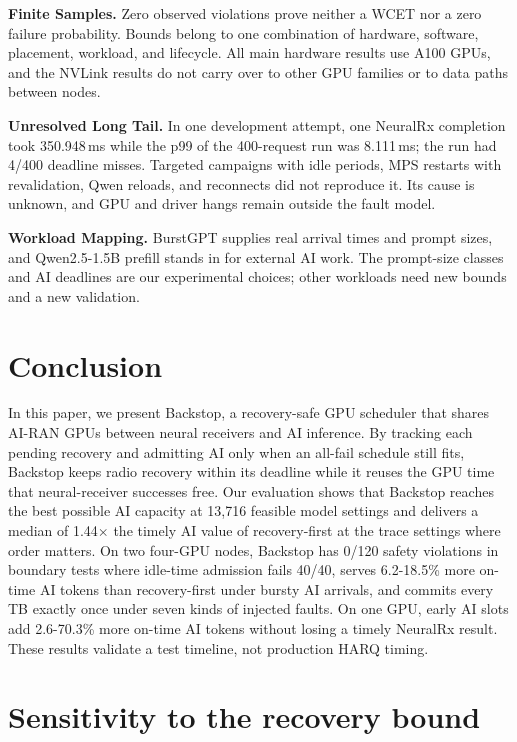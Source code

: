 \documentclass[acmsmall,screen,review,anonymous]{acmart}
\newcommand{\sys}{Backstop\xspace}
\newcommand{\NRx}{NeuralRx\xspace}
\begin{document}
\noindent\textbf{Finite Samples.}
Zero observed violations prove neither a WCET nor a zero failure probability. Bounds belong to one
combination of hardware, software, placement, workload, and lifecycle. All main hardware results use A100
GPUs, and the NVLink results do not carry over to other GPU families or to data paths between nodes.

\noindent\textbf{Unresolved Long Tail.}
In one development attempt, one \NRx completion took 350.948\,ms while the p99 of the 400-request run was
8.111\,ms; the run had 4/400 deadline misses. Targeted campaigns with idle periods, MPS restarts with
revalidation, Qwen reloads, and reconnects did not reproduce it. Its cause is unknown, and GPU and driver
hangs remain outside the fault model.

\noindent\textbf{Workload Mapping.}
BurstGPT supplies real arrival times and prompt sizes, and Qwen2.5-1.5B prefill stands in for external AI
work. The prompt-size classes and AI deadlines are our experimental choices; other workloads need new
bounds and a new validation.

\section{Conclusion}

In this paper, we present \sys, a recovery-safe GPU scheduler that shares AI-RAN GPUs between neural
receivers and AI inference. By tracking each pending recovery and admitting AI only when an all-fail
schedule still fits, \sys keeps radio recovery within its deadline while it reuses the GPU time that
neural-receiver successes free. Our evaluation shows that \sys reaches the best possible AI capacity at
13,716 feasible model settings and delivers a median of 1.44$\times$ the timely AI value of recovery-first
at the trace settings where order matters. On two four-GPU nodes, \sys has 0/120 safety violations in
boundary tests where idle-time admission fails 40/40, serves 6.2-18.5\% more on-time AI tokens than
recovery-first under bursty AI arrivals, and commits every TB exactly once under seven kinds of injected
faults. On one GPU, early AI slots add 2.6-70.3\% more on-time AI tokens without losing a timely \NRx
result. These results validate a test timeline, not production HARQ timing.




\appendix

\section{Sensitivity to the recovery bound}
\label{app:sensitivity}
\end{document}
